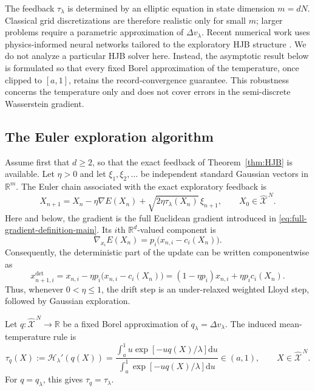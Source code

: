 \documentclass[11pt]{article}
\def\R{\mathbb{R}}
\def\Xc{{\mathcal X}}
\def\hX{\widehat{\Xc}^{\,N}}
\newcommand{\dd}{\mathrm{d}}
\theoremstyle{definition}
\theoremstyle{remark}
\numberwithin{equation}{section}
\begin{document}
The feedback $\tau_\lambda$ is determined by an elliptic equation in state dimension $m=dN$.
Classical grid discretizations are therefore realistic only for small $m$; larger problems require
a parametric approximation of $\Delta v_\lambda$.  Recent numerical work uses physics-informed
neural networks tailored to the exploratory HJB structure
\cite{WangLiWangZhang2026}.  We do not analyze a particular HJB solver here.  Instead, the
asymptotic result below is formulated so that every fixed Borel approximation of the temperature,
once clipped to $[a,1]$, retains the record-convergence guarantee.  This robustness concerns the
temperature only and does not cover errors in the semi-discrete Wasserstein gradient.

\subsection{The Euler exploration algorithm}

Assume first that $d\ge2$, so that the exact feedback of Theorem~\ref{thm:HJB} is available.  Let
$\eta>0$ and let $\xi_1,\xi_2,\ldots$ be independent standard Gaussian vectors in $\R^m$.  The
Euler chain associated with the exact exploratory feedback is
\begin{equation}\label{eq:euler-exact}
 X_{n+1}
 =X_n-\eta\nabla E(X_n)
 +\sqrt{2\eta\tau_\lambda(X_n)}\,\xi_{n+1},
 \qquad X_0\in\hX.
\end{equation}
Here and below, the gradient is the full Euclidean gradient introduced in
\eqref{eq:full-gradient-definition-main}.  Its $i$th $\R^d$-valued component is
\begin{equation}\label{eq:gradient-component-algorithm}
 \nabla_{x_i}E(X_n)
 =p_i\bigl(x_{n,i}-c_i(X_n)\bigr).
\end{equation}
Consequently, the deterministic part of the update can be written componentwise as
\begin{equation}\label{eq:underrelaxed-Lloyd-step}
 x_{n+1,i}^{\mathrm{det}}
 =x_{n,i}-\eta p_i\bigl(x_{n,i}-c_i(X_n)\bigr)
 =(1-\eta p_i)x_{n,i}+\eta p_i c_i(X_n).
\end{equation}
Thus, whenever $0<\eta\le1$, the drift step is an under-relaxed weighted Lloyd step, followed by
Gaussian exploration.

Let $q:\hX\to\R$ be a fixed Borel approximation of $q_\lambda=\Delta v_\lambda$.  The induced
mean-temperature rule is
\begin{equation}\label{eq:approx-temperature-algorithm}
 \tau_q(X)
 :=\mathscr H_\lambda'(q(X))
 =\frac{\int_a^1u\exp[-uq(X)/\lambda]\dd u}
 {\int_a^1\exp[-uq(X)/\lambda]\dd u}
 \in(a,1),
 \qquad X\in\hX.
\end{equation}
For $q=q_\lambda$, this gives $\tau_q=\tau_\lambda$.
\end{document}
